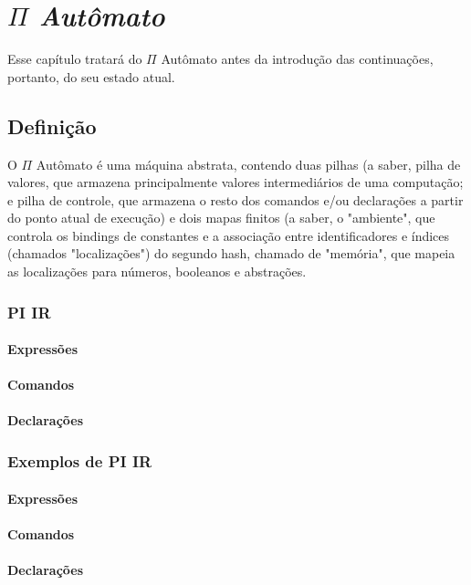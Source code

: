 \chapter{\textit{$\Pi$ Autômato}}
Esse capítulo tratará do $\Pi$ Autômato antes da introdução das continuações, portanto, do seu estado atual.
\section{Definição}
O $\Pi$ Autômato é uma máquina abstrata, contendo duas pilhas (a saber, pilha de valores, que armazena principalmente valores intermediários de uma computação; e pilha de controle, que armazena o resto dos comandos e/ou declarações a partir do ponto atual de execução) e dois mapas finitos (a saber, o "ambiente", que controla os bindings de constantes e a associação entre identificadores e índices (chamados "localizações") do segundo hash, chamado de "memória", que mapeia as localizações para números, booleanos e abstrações.
\subsection{PI IR}
\subsubsection{Expressões}
\subsubsection{Comandos}
\subsubsection{Declarações}

\subsection{Exemplos de PI IR}
\subsubsection{Expressões}
\subsubsection{Comandos}
\subsubsection{Declarações}\label{declarações}